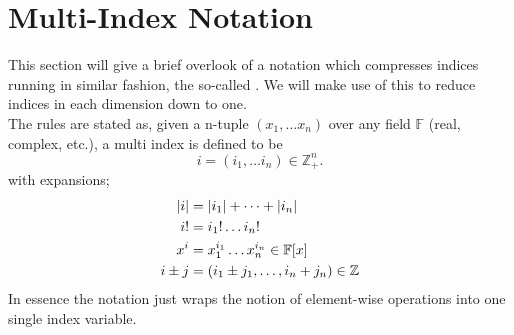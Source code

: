 \section{Multi-Index Notation\label{sec:multiIndexNotation}}
    This section will give a brief overlook of a notation which compresses
    indices running in similar fashion, the so-called \cite{multiindex}. We will make use of this to reduce indices in
    each dimension down to one. \\
    The rules are stated as, given a n-tuple $(x_1,\dots x_n)$ over any field
    $\mathbb{F}$ (real, complex, etc.), a multi index is defined to be 
        \begin{equation}
            i=(i_1,\dots i_n)\in \mathbb{Z}^n_+.
        \end{equation}
    with expansions;
        \begin{equation}
            \begin{aligned}
                \abs{i} &= \abs{i_1} + \dots + \abs{i_n} \\
                i! &= i_1! \dots i_n! \\
                x^i &= x^{i_1}_1 \dots x^{i_n}_n \in \mathbb{F}[x] \\
                i \pm j &= (i_1 \pm j_1,\dots, i_n+j_n) \in \mathbb{Z}
            \end{aligned}
        \end{equation}
    In essence the notation just wraps the notion of element-wise operations
    into one single index variable.
